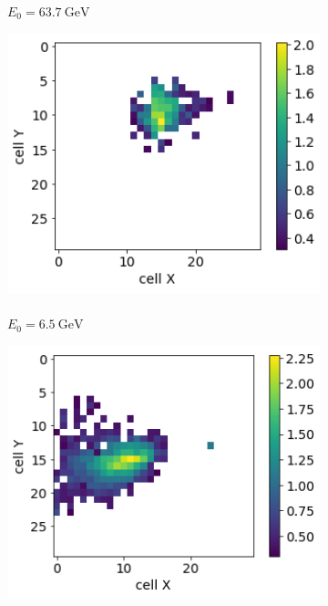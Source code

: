 \begin{figure}
\begin{subfigure}{0.24\textwidth}
    \caption{\\$E_0 = 63.7~\text{GeV}$ }%
  \end{subfigure}
  \begin{subfigure}{0.24\textwidth}
    \centering
    \includegraphics[width=1\textwidth]{figures/2_gen.png}
    \caption{\\$E_0 = 6.5~\text{GeV}$ }%
  \end{subfigure}
    \begin{subfigure}{0.24\textwidth}
    \centering
    \includegraphics[width=1\textwidth]{figures/3_gen.png}

\end{subfigure}
\end{figure}
